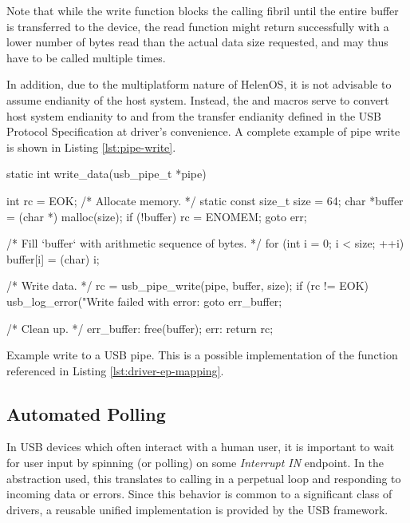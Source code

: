 Note that while the write function blocks the calling fibril until the entire
buffer is transferred to the device, the read function might return successfully
with a lower number of bytes read than the actual data size requested, and may
thus have to be called multiple times.

In addition, due to the multiplatform nature of HelenOS, it is not advisable to
assume endianity of the host system. Instead, the 
and  macros serve to convert host system endianity
to and from the transfer endianity defined in the USB Protocol Specification at
driver's convenience. A complete example of pipe write is shown in Listing
\ref{lst:pipe-write}.

\begin{listing}
	\begin{code}
		static int write_data(usb_pipe_t *pipe)
		{
			int rc = EOK;
			/* Allocate memory. */
			static const size_t size = 64;
			char *buffer = (char *) malloc(size);
			if (!buffer) {
				rc = ENOMEM;
				goto err;
			}

			/* Fill `buffer` with arithmetic sequence of bytes. */
			for (int i = 0; i < size; ++i) buffer[i] = (char) i;

			/* Write data. */
			rc = usb_pipe_write(pipe, buffer, size);
			if (rc != EOK) {
				usb_log_error("Write failed with error: %
				goto err_buffer;
			}

			/* Clean up. */
		err_buffer:
			free(buffer);
		err:
			return rc;
		}
	\end{code}
	\caption[Example write to a USB pipe.]{Example write to a USB pipe. This is
	a possible implementation of the  function referenced in
	Listing \ref{lst:driver-ep-mapping}.}
	\label{lst:pipe-write}
\end{listing}


\subsection{Automated Polling}

In USB devices which often interact with a human user, it is important to wait
for user input by spinning (or polling) on some \textit{Interrupt IN} endpoint.
In the abstraction used, this translates to calling  in a
perpetual loop and responding to incoming data or errors. Since this behavior is
common to a significant class of drivers, a reusable unified implementation is
provided by the USB framework.

